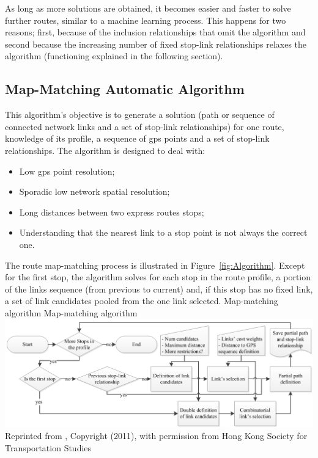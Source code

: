 As long as more solutions are obtained, it becomes easier and faster to solve further routes, similar to a  machine learning process. This happens for two reasons; first, because of the inclusion relationships that omit the algorithm and second because the increasing number of fixed stop-link relationships relaxes the algorithm  (functioning explained in the following section).

\subsection{Map-Matching Automatic Algorithm}
This algorithm's objective is to generate a solution (path or sequence of connected network links and a set of stop-link relationships) for one route, knowledge of its profile, a sequence of \gls{gps} points and a set of stop-link relationships. The algorithm is designed to deal with:
%
\begin{itemize}\styleItemize
\item	Low \gls{gps} point resolution;
\item	Sporadic low network spatial resolution;
\item	Long distances between two express routes stops;
\item	Understanding that the nearest link to a stop point is not always the correct one.
\end{itemize}

The route map-matching process is illustrated in Figure~\ref{fig:Algorithm}. Except for the first stop, the algorithm solves for each stop in the route profile, a portion of the links sequence (from previous to current) and, if this stop has no fixed link, a set of link candidates pooled from the one link selected.
%
\createfigure
{Map-matching algorithm}
{Map-matching algorithm}
{\label{fig:Algorithm}}
{\includegraphics[width=1.0\textwidth]{extending/figures/semiAuto/Algorithm.png}}
{Reprinted from \citet[][p.755]{Ordonez_HKSTS_2011}, Copyright (2011), with permission from Hong Kong Society for Transportation Studies}

